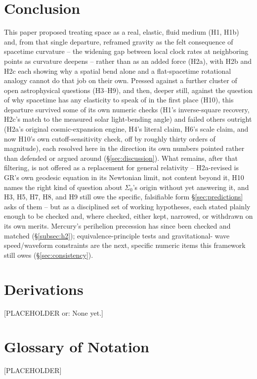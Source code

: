 \documentclass[12pt, a4paper]{article}
\begin{document}
\section{Conclusion}
\label{sec:conclusion}
This paper proposed treating space as a real, elastic, fluid medium
(H1, H1b) and, from that single departure, reframed gravity as the
felt consequence of spacetime curvature -- the widening gap between
local clock rates at neighboring points as curvature deepens --
rather than as an added force (H2a), with H2b and H2c each showing
why a spatial bend alone and a flat-spacetime rotational analogy
cannot do that job on their own. Pressed against a further cluster of
open astrophysical questions (H3--H9), and then, deeper still, against
the question of why spacetime has any elasticity to speak of in the
first place (H10), this departure survived some of its own numeric
checks (H1's inverse-square recovery, H2c's match to the measured
solar light-bending angle) and failed others outright (H2a's original
cosmic-expansion engine, H4's literal claim, H6's scale claim, and
now H10's own cutoff-sensitivity check, off by roughly thirty orders
of magnitude), each resolved here in the direction its own numbers
pointed rather than defended or argued around (\S\ref{sec:discussion}).
What remains, after that filtering, is not offered as a replacement
for general relativity -- H2a-revised is GR's own geodesic equation
in its Newtonian limit, not content beyond it, H10 names the right
kind of question about $\Sigma_0$'s origin without yet answering it,
and H3, H5, H7, H8, and H9 still owe the specific, falsifiable form
\S\ref{sec:predictions} asks of them -- but as a disciplined set of
working hypotheses, each stated plainly enough to be checked and,
where checked, either kept, narrowed, or withdrawn on its own merits.
Mercury's perihelion precession has since been checked and matched
(\S\ref{subsec:h2}); equivalence-principle tests and gravitational-
wave speed/waveform constraints are the next, specific numeric items
this framework still owes
(\S\ref{sec:consistency}).

\appendix
\section{Derivations}
[PLACEHOLDER or: None yet.]

\section{Glossary of Notation}
[PLACEHOLDER]
\end{document}
